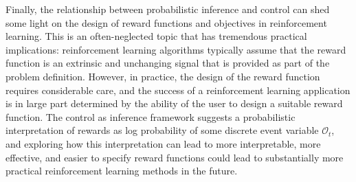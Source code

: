 Finally, the relationship between probabilistic inference and control can shed some light on the design of reward functions and objectives in reinforcement learning. This is an often-neglected topic that has tremendous practical implications: reinforcement learning algorithms typically assume that the reward function is an extrinsic and unchanging signal that is provided as part of the problem definition. However, in practice, the design of the reward function requires considerable care, and the success of a reinforcement learning application is in large part determined by the ability of the user to design a suitable reward function. The control as inference framework suggests a probabilistic interpretation of rewards as log probability of some discrete event variable $\mathcal{O}_t$, and exploring how this interpretation can lead to more interpretable, more effective, and easier to specify reward functions could lead to substantially more practical reinforcement learning methods in the future.


